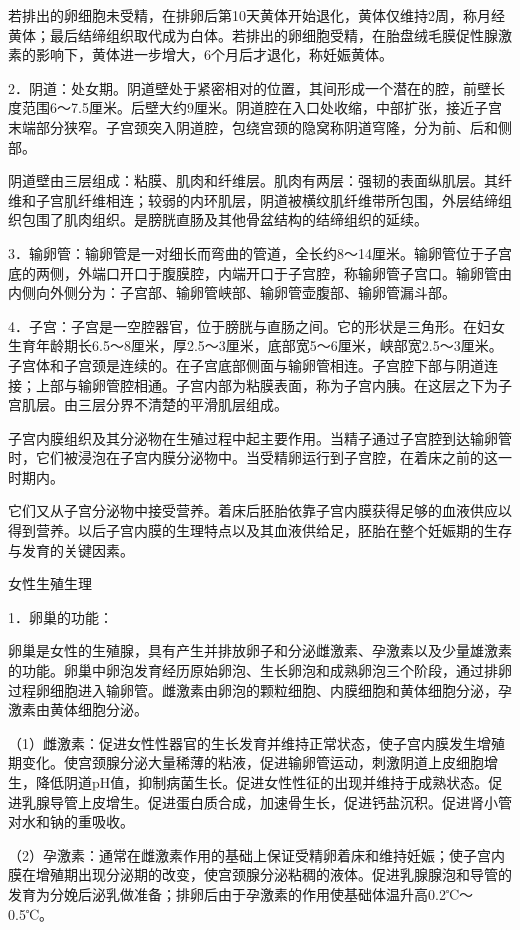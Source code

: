 \documentclass[12pt,UTF8,openany]{ctexbook}
\begin{document}
若排出的卵细胞未受精，在排卵后第10天黄体开始退化，黄体仅维持2周，称月经黄体；最后结缔组织取代成为白体。若排出的卵细胞受精，在胎盘绒毛膜促性腺激素的影响下，黄体进一步增大，6个月后才退化，称妊娠黄体。

2．阴道：处女期。阴道壁处于紧密相对的位置，其间形成一个潜在的腔，前壁长度范围6～7.5厘米。后壁大约9厘米。阴道腔在入口处收缩，中部扩张，接近子宫末端部分狭窄。子宫颈突入阴道腔，包绕宫颈的隐窝称阴道穹隆，分为前、后和侧部。

阴道壁由三层组成：粘膜、肌肉和纤维层。肌肉有两层：强韧的表面纵肌层。其纤维和子宫肌纤维相连；较弱的内环肌层，阴道被横纹肌纤维带所包围，外层结缔组织包围了肌肉组织。是膀胱直肠及其他骨盆结构的结缔组织的延续。

3．输卵管：输卵管是一对细长而弯曲的管道，全长约8～14厘米。输卵管位于子宫底的两侧，外端口开口于腹膜腔，内端开口于子宫腔，称输卵管子宫口。输卵管由内侧向外侧分为：子宫部、输卵管峡部、输卵管壶腹部、输卵管漏斗部。

4．子宫：子宫是一空腔器官，位于膀胱与直肠之间。它的形状是三角形。在妇女生育年龄期长6.5～8厘米，厚2.5～3厘米，底部宽5～6厘米，峡部宽2.5～3厘米。子宫体和子宫颈是连续的。在子宫底部侧面与输卵管相连。子宫腔下部与阴道连接；上部与输卵管腔相通。子宫内部为粘膜表面，称为子宫内胰。在这层之下为子宫肌层。由三层分界不清楚的平滑肌层组成。

子宫内膜组织及其分泌物在生殖过程中起主要作用。当精子通过子宫腔到达输卵管时，它们被浸泡在子宫内膜分泌物中。当受精卵运行到子宫腔，在着床之前的这一时期内。

它们又从子宫分泌物中接受营养。着床后胚胎依靠子宫内膜获得足够的血液供应以得到营养。以后子宫内膜的生理特点以及其血液供给足，胚胎在整个妊娠期的生存与发育的关键因素。

女性生殖生理

1．卵巢的功能：

卵巢是女性的生殖腺，具有产生并排放卵子和分泌雌激素、孕激素以及少量雄激素的功能。卵巢中卵泡发育经历原始卵泡、生长卵泡和成熟卵泡三个阶段，通过排卵过程卵细胞进入输卵管。雌激素由卵泡的颗粒细胞、内膜细胞和黄体细胞分泌，孕激素由黄体细胞分泌。

（1）雌激素：促进女性性器官的生长发育并维持正常状态，使子宫内膜发生增殖期变化。使宫颈腺分泌大量稀薄的粘液，促进输卵管运动，刺激阴道上皮细胞增生，降低阴道pH值，抑制病菌生长。促进女性性征的出现并维持于成熟状态。促进乳腺导管上皮增生。促进蛋白质合成，加速骨生长，促进钙盐沉积。促进肾小管对水和钠的重吸收。

（2）孕激素：通常在雌激素作用的基础上保证受精卵着床和维持妊娠；使子宫内膜在增殖期出现分泌期的改变，使宫颈腺分泌粘稠的液体。促进乳腺腺泡和导管的发育为分娩后泌乳做准备；排卵后由于孕激素的作用使基础体温升高0.2℃～0.5℃。
\end{document}
